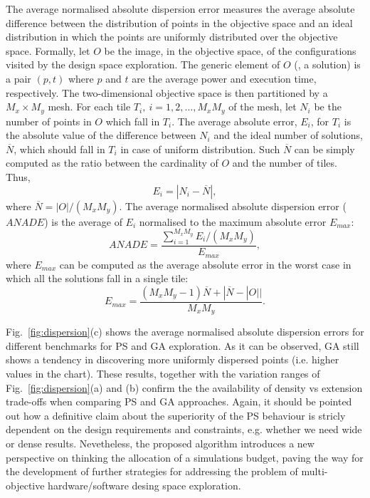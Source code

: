\begin{table}
\end{table}
The average normalised absolute dispersion error measures
the average absolute difference between the distribution of points in
the objective space and an ideal distribution in which the points are
uniformly distributed over the objective space. Formally, let $O$ be
the image, in the objective space, of the configurations visited by
the design space exploration. The generic element of $O$ (\ie, a
solution) is a pair $(p,t)$ where $p$ and $t$ are the average power
and execution time, respectively. The two-dimensional objective space
is then partitioned by a $M_x \times M_y$ mesh. For each tile $T_i,
\ i=1, 2, \ldots, M_xM_y$ of the mesh, let $N_i$ be the number
of points in $O$ which fall in $T_i$. The average absolute error, $E_i$, for
$T_i$ is the absolute value of the difference between $N_i$ and the
ideal number of solutions, $\overline{N}$, which should fall in $T_i$
in case of uniform distribution. Such $\overline{N}$ can be simply
computed as the ratio between the cardinality of $O$ and the number of
tiles. Thus,
\[ E_i = |N_i - \overline{N}|, \]
where $\overline{N} = |O| / (M_x M_y)$. The average
normalised absolute dispersion error ($ANADE$) is the average of $E_i$
normalised to the maximum absolute error $E_{max}$:
\[ ANADE = \frac{\sum_{i=1}^{M_xM_y} E_i/(M_xM_y)}{E_{max}}, \]
where $E_{max}$ can be computed as the average absolute error in the worst
case in which all the solutions fall in a single tile:
\[ E_{max} = \frac{(M_x M_y - 1) \overline{N} + |\overline{N} -
    |O|| }{M_x M_y}. \] 

Fig.~\ref{fig:dispersion}(c) shows the average normalised absolute
dispersion errors for different benchmarks for PS and GA
exploration. As it can be observed, GA still shows a tendency in
discovering more uniformly dispersed points (i.e. higher values in the
chart). These results,
together with the variation ranges of Fig.~\ref{fig:dispersion}(a) and
(b) confirm the the availability of density vs extension trade-offs
when comparing PS and GA approaches. Again, it
should be pointed out how a definitive claim about the superiority of
the PS behaviour is stricly dependent on the design 
requirements and constraints, e.g. whether we need wide or dense
results. Nevetheless, the proposed algorithm introduces a new
perspective on thinking the allocation of a simulations budget, paving the way for
the development of further strategies for addressing the problem of
multi-objective hardware/software desing space exploration.

